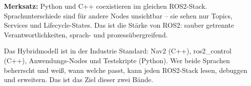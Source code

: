 \begin{merksatzBox}
\textbf{Merksatz:}
Python und C++ coexistieren im gleichen ROS2-Stack.
Sprachunterschiede sind für andere Nodes unsichtbar --
sie sehen nur Topics, Services und Lifecycle-States.
Das ist die Stärke von ROS2: sauber getrennte Verantwortlichkeiten,
sprach- und prozessübergreifend.
\end{merksatzBox}

\begin{robotikBox}
Das Hybridmodell ist in der Industrie Standard:
Nav2 (C++), ros2\_control (C++),
Anwendungs-Nodes und Testskripte (Python).
Wer beide Sprachen beherrscht und weiß, wann welche passt,
kann jeden ROS2-Stack lesen, debuggen und erweitern.
Das ist das Ziel dieser zwei Bände.
\end{robotikBox}
